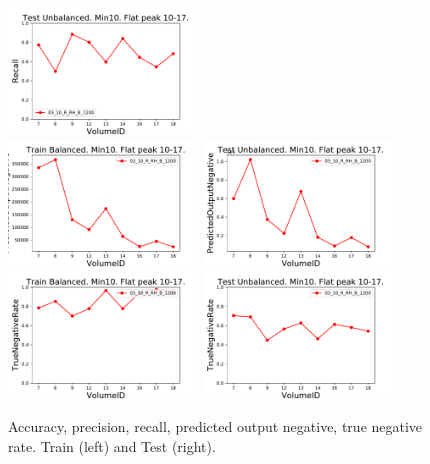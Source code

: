 \begin{figure}[t]
\includegraphics[width=0.45\textwidth]{plots/plot_03_1_overlay_graph_Recall_VolumeID_Test.pdf}\\
\includegraphics[width=0.45\textwidth]{plots/plot_03_1_overlay_graph_PredictedOutputNegative_VolumeID_Train.pdf}
\includegraphics[width=0.45\textwidth]{plots/plot_03_1_overlay_graph_PredictedOutputNegative_VolumeID_Test.pdf}\\
\includegraphics[width=0.45\textwidth]{plots/plot_03_1_overlay_graph_TrueNegativeRate_VolumeID_Train.pdf}
\includegraphics[width=0.45\textwidth]{plots/plot_03_1_overlay_graph_TrueNegativeRate_VolumeID_Test.pdf}\\
\caption{Accuracy, precision, recall, predicted output negative, true negative rate. Train (left) and Test (right).}
\label{fig:FiguresOfMerit1}
\end{figure}

